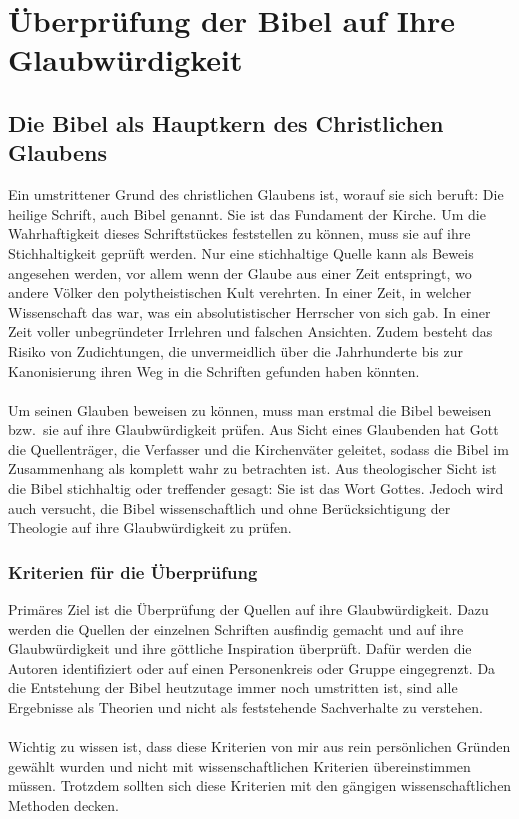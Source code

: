 \part{Überprüfung der Bibel auf Ihre Glaubwürdigkeit}
\chapter{Die Bibel als Hauptkern des Christlichen Glaubens}
Ein umstrittener Grund des christlichen Glaubens ist, worauf sie sich beruft: Die heilige Schrift, auch Bibel genannt. Sie ist das Fundament der Kirche. Um die Wahrhaftigkeit dieses Schriftstückes feststellen zu können, muss sie auf ihre Stichhaltigkeit geprüft werden. Nur eine stichhaltige Quelle kann als Beweis angesehen werden, vor allem wenn der Glaube aus einer Zeit entspringt, wo andere Völker den polytheistischen Kult verehrten. In einer Zeit, in welcher Wissenschaft das war, was ein absolutistischer Herrscher von sich gab. In einer Zeit voller unbegründeter Irrlehren und falschen Ansichten. Zudem besteht das Risiko von Zudichtungen, die unvermeidlich über die Jahrhunderte bis zur Kanonisierung ihren Weg in die Schriften gefunden haben könnten.
\\~\\
Um seinen Glauben beweisen zu können, muss man erstmal die Bibel beweisen bzw.\ sie auf ihre Glaubwürdigkeit prüfen. Aus Sicht eines Glaubenden hat Gott die Quellenträger, die Verfasser und die Kirchenväter geleitet, sodass die Bibel im Zusammenhang als komplett wahr zu betrachten ist. Aus theologischer Sicht ist die Bibel stichhaltig oder treffender gesagt: Sie ist das Wort Gottes. Jedoch wird auch versucht, die Bibel wissenschaftlich und ohne Berücksichtigung der Theologie auf ihre Glaubwürdigkeit zu prüfen.

\section{Kriterien für die Überprüfung}
Primäres Ziel ist die Überprüfung der Quellen auf ihre Glaubwürdigkeit. Dazu werden die Quellen der einzelnen Schriften ausfindig gemacht und auf ihre Glaubwürdigkeit und ihre göttliche Inspiration überprüft. Dafür werden die Autoren identifiziert oder auf einen Personenkreis oder Gruppe eingegrenzt.
Da die Entstehung der Bibel heutzutage immer noch umstritten ist, sind alle Ergebnisse als Theorien und nicht als feststehende Sachverhalte zu verstehen.
\\~\\
Wichtig zu wissen ist, dass diese Kriterien von mir aus rein persönlichen Gründen gewählt wurden und nicht mit wissenschaftlichen Kriterien übereinstimmen müssen. Trotzdem sollten sich diese Kriterien mit den gängigen wissenschaftlichen Methoden decken.


